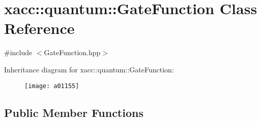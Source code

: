 \hypertarget{a01155}{}\section{xacc\+:\+:quantum\+:\+:Gate\+Function Class Reference}
\label{a01155}


{\ttfamily \#include $<$Gate\+Function.\+hpp$>$}

Inheritance diagram for xacc\+:\+:quantum\+:\+:Gate\+Function\+:\begin{figure}[H]
\begin{center}
\leavevmode
\texttt{[image: a01155]}
\end{center}
\end{figure}
\subsection*{Public Member Functions}
